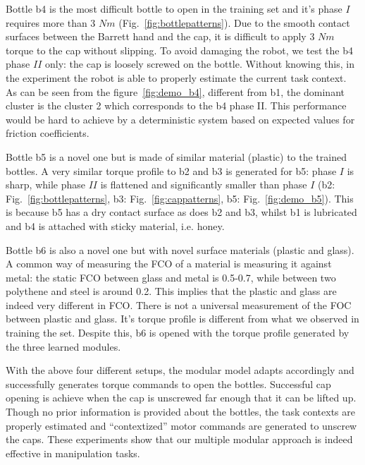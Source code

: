 Bottle b4 is the most difficult bottle to open in the training set and it's phase $I$ requires more than 3 $Nm$ (Fig.~\ref{fig:bottlepatterns}). Due to the smooth contact surfaces between the Barrett hand and the cap, it is difficult to apply 3 $Nm$ torque to the cap without slipping. To avoid damaging the robot, we test the b4 phase $II$ only: the cap is loosely screwed on the bottle. Without knowing this, in the experiment the robot is able to properly estimate the current task context. As can be seen from the figure~\ref{fig:demo_b4}, different from b1, the dominant cluster is the cluster 2 which corresponds to the b4 phase II. This performance would be hard to achieve by a deterministic system based on expected values for friction coefficients.

Bottle b5 is a novel one but is made of similar material (plastic) to the trained bottles. A very similar torque profile to b2 and b3 is generated for b5: phase $I$ is sharp, while phase $II$ is flattened and significantly smaller than phase $I$ (b2: Fig.~\ref{fig:bottlepatterns}, b3: Fig.~\ref{fig:cappatterns}, b5: Fig.~\ref{fig:demo_b5}). This is because b5 has a dry contact surface as does b2 and b3, whilst b1 is lubricated and b4 is attached with sticky material, i.e. honey.

Bottle b6 is also a novel one but with novel surface materials (plastic and glass). A common way of measuring the FCO of a material is measuring it against metal: the static FCO between glass and metal is 0.5-0.7, while between two polythene and steel is around 0.2. This implies that the plastic and glass are indeed very different in FCO. There is not a universal measurement of the FOC between plastic and glass. It's torque profile is different from what we observed in training the set. Despite this, b6 is opened with the torque profile generated by the three learned modules.

With the above four different setups, the modular model adapts accordingly and successfully generates torque commands to open the bottles. Successful cap opening is achieve when the cap is unscrewed far enough that it can be lifted up. Though no prior information is provided about the bottles, the task contexts are properly estimated and ``contextized'' motor commands are generated to unscrew the caps. These experiments show that our multiple modular approach is indeed effective in manipulation tasks.



